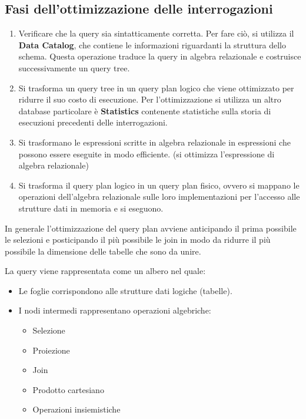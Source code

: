 \subsection{Fasi dell'ottimizzazione delle interrogazioni}
\begin{enumerate}
      \item Verificare che la query sia sintatticamente corretta. Per fare ciò,
            si utilizza il \textbf{Data Catalog}, che contiene le informazioni
            riguardanti la struttura dello schema.
            Questa operazione traduce la query in algebra relazionale e costruisce
            successivamente un query tree.
      \item Si trasforma un query tree in un query plan logico che viene ottimizzato
            per ridurre il suo costo di esecuzione. Per l'ottimizzazione si
            utilizza un altro database particolare è \textbf{Statistics}
            contenente statistiche sulla storia di esecuzioni precedenti delle
            interrogazioni.
      \item Si trasformano le espressioni scritte in algebra relazionale in
            espressioni che possono essere eseguite in modo efficiente. (si
            ottimizza l'espressione di algebra relazionale)
      \item Si trasforma il query plan logico in un query plan fisico, ovvero
            si mappano le operazioni dell'algebra relazionale sulle loro
            implementazioni per l'accesso alle strutture dati in memoria e si eseguono.
\end{enumerate}
\begin{nota}
      In generale l'ottimizzazione del query plan avviene anticipando il prima possibile
      le selezioni e posticipando il più possibile le join in modo da ridurre il più
      possibile la dimensione delle tabelle che sono da unire.
\end{nota}
\begin{definizione}
      La query viene rappresentata come un albero nel quale:
      \begin{itemize}
            \item Le foglie corrispondono alle strutture dati logiche (tabelle).
            \item I nodi intermedi rappresentano operazioni algebriche:
                  \begin{itemize}
                        \item Selezione
                        \item Proiezione
                        \item Join
                        \item Prodotto cartesiano
                        \item Operazioni insiemistiche
                  \end{itemize}
      \end{itemize}
\end{definizione}
